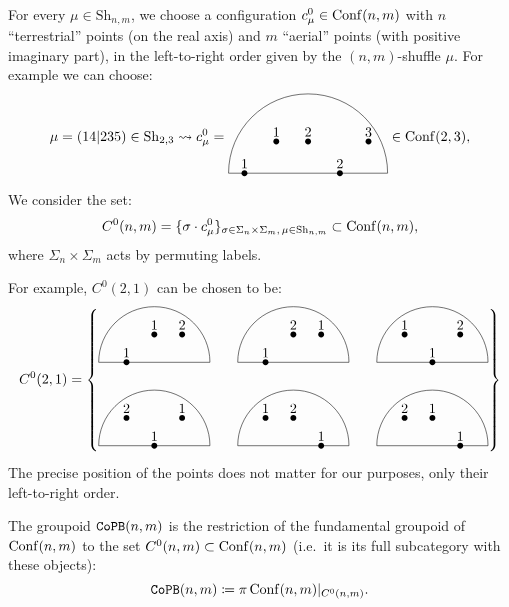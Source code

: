 For every $\mu \in \mathrm{Sh}_{n,m}$, we choose a configuration $c^{0}_{\mu} \in \operatorname{Conf}(n,m)$ with $n$ ``terrestrial'' points (on the real axis) and $m$ ``aerial'' points (with positive imaginary part), in the left-to-right order given by the $(n,m)$-shuffle $\mu$.
For example we can choose:
\begin{equation}
\mu = (14|235) \in \mathrm{Sh}_{2,3} \leadsto c^{0}_{\mu} =
  \begin{gathered}
    \begin{tikzpicture}[scale = 0.4]
      \draw (5,0) arc (0:180:5); \draw (-5,0) -- (5,0);
      \bdot{-4,0}{1}; \bdot{-2,2}{1}; \bdot{0,2}{2}; \bdot{2,0}{2};
      \bdot{3.8,2}{3};
    \end{tikzpicture}
  \end{gathered}
  \in \Conf(2,3),
  \label{sw.eq.exa-ob-copb}
\end{equation}
We consider the set:
\[ C^{0}(n,m) = \{ \sigma \cdot c^{0}_{\mu} \}_{\sigma \in \Sigma_{n} \times \Sigma_{m}, \, \mu \in \mathrm{Sh}_{n,m}} \subset \operatorname{Conf}(n,m), \]
where $\Sigma_{n} \times \Sigma_{m}$ acts by permuting labels.

\begin{example}
  For example, $C^{0}(2,1)$ can be chosen to be:
  \[ C^{0}(2,1) = \left\{
      \begin{gathered}
        \begin{tikzpicture}[scale=0.7]
          \foreach[count=\i] \ya/\la/\yb/\lb/\yc/\lc in
          { 0/1/1/1/1/2, 0/1/1/2/1/1, 1/1/0/1/1/2, 1/2/0/1/1/1, 1/1/1/2/0/1, 1/2/1/1/0/1 }
          {
            \begin{scope}[xshift={5cm*mod(\i-1,3)}, yshift={-3cm*int((\i-1)/3)} ]
              \draw (2,0) arc (0:180:2); \draw (-2,0) -- (2,0);
              \bdot{-1,\ya}{\la}; \bdot{0,\yb}{\lb}; \bdot{1,\yc}{\lc};
            \end{scope}
          }
        \end{tikzpicture}
      \end{gathered}
    \right\} \]
  The precise position of the points does not matter for our purposes, only their left-to-right order.
\end{example}

\begin{definition}
  The groupoid $\mathtt{CoPB}(n,m)$  is the restriction of the fundamental group\-oid of $\operatorname{Conf}(n,m)$ to the set $C^{0}(n,m) \subset \operatorname{Conf}(n,m)$ (i.e.\ it is its full subcategory with these objects):
  \[ \mathtt{CoPB}(n,m) \coloneqq \pi \operatorname{Conf}(n,m)|_{C^{0}(n,m)}. \]
\end{definition}

